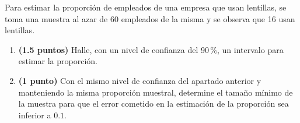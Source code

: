 
Para estimar la proporción de empleados de una empresa que usan lentillas,
se toma una muestra al azar de 60 empleados de la misma y se observa que
16 usan lentillas.
\begin{enumerate}[label=\alph*)]
  \item \textbf{(1.5 puntos)} Halle, con un nivel de confianza del 90\,\%,
  un intervalo para estimar la proporción.
  \item \textbf{(1 punto)} Con el mismo nivel de confianza del apartado
  anterior y manteniendo la misma proporción muestral, determine el tamaño
  mínimo de la muestra para que el error cometido en la estimación de la
  proporción sea inferior a $0.1$.
\end{enumerate}
